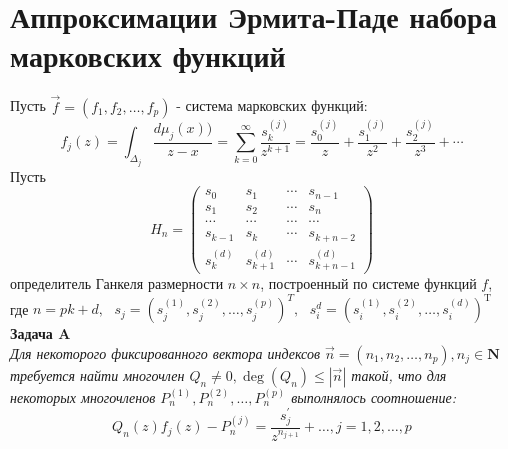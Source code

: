 \section{Аппроксимации Эрмита-Паде набора марковских функций}

Пусть $\overrightarrow{f}=(f_1,f_2,\ldots,f_p)$ - система
марковских функций:
\begin{equation}
\label{Markov_system} f_j(z)
=\int_{\Delta_j}{\displaystyle\frac{d\mu_j(x))}{z-x}}
=\sum\limits_{k=0}^{\infty} \frac { s_{k}^{(j)} } {z^{k+1}}
=\frac { s_{0}^{(j)} } {z} + \frac { s_{1}^{(j)} } {z^{2}} +\frac
{ s_{2}^{(j)} } {z^{3}}+\cdots
\end{equation}
Пусть
\begin{equation}
\label{H} H_n=\left(
\begin{array}{ccccc}
s_0           & s_{1}         & \cdots & s_{n-1}        \\
s_{1}         & s_{2}         & \cdots & s_{n}          \\
\cdots        & \cdots        & \cdots & \cdots         \\
s_{k-1}       & s_{k}         & \cdots & s_{k+n-2}      \\
s_{k}^{(d)}   & s_{k+1}^{(d)} & \cdots & s_{k+n-1}^{(d)}
\end{array}
\right)
\end{equation}
определитель Ганкеля размерности $n \times n$, построенный по
системе функций $f$, где $n=pk+d, \mbox{   }
s_j=(s_j^{(1)},s_j^{(2)},\ldots,s_j^{(p)})^T, \mbox{   }
s_i^{d}=(s_i^{(1)},s_i^{(2)},\ldots,s_i^{(d)})^{\mbox{T}}$ \\
\textbf{Задача A} \\ \textit{Для некоторого фиксированного вектора
индексов $\overrightarrow{n}=(n_1,n_2,\ldots,n_p),n_j\in{ \textbf{N} }$ требуется найти многочлен $Q_n\not=0,\deg
(Q_n)\leq{|\overrightarrow{n}|}$ такой, что для некоторых
многочленов $P_n^{(1)},P_n^{(2)},\ldots,P_n^{(p)}$ выполнялось
соотношение:\/}
\begin{equation}
\label{Vector_Pade} Q_n(z)f_j(z)-P_n^{(j)}= \frac {s_j^{'}}
{z^{n_{j+1}}} +\ldots,j=1,2,\ldots,p
\end{equation}
